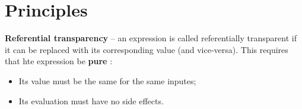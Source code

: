 \section{Principles}

{\bf Referential transparency} \cite{referential-transparency} -- an expression is called
referentially transparent if it can be replaced with its corresponding value
(and vice-versa). This requires that hte expression be {\bf pure} :

\begin{itemize}
    \item Its value must be the same for the same inputes;
    \item Its evaluation must have no side effects.
\end{itemize}


